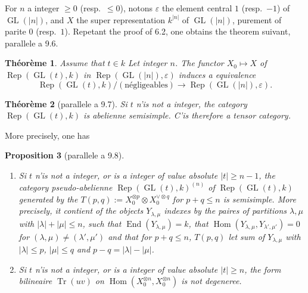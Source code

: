 \documentclass[11pt,a4paper]{article}
\theoremstyle{plain}
\newtheorem{theorem}{Th\'eor\`eme}[section]
\newtheorem{proposition}[theorem]{Proposition}
\theoremstyle{definition}
\DeclareMathOperator{\Hom}{Hom}
\DeclareMathOperator{\End}{End}
\DeclareMathOperator{\Tr}{Tr}
\DeclareMathOperator{\Rep}{Rep}
\DeclareMathOperator{\GL}{GL}
\newcommand{\eps}{\varepsilon}
\begin{document}
For $n$ a integer $\geq 0$ (resp.~$\leq 0$), notons $\eps$ the element central $1$ (resp.~$-1$) of $\GL(|n|)$, and $X$ the super representation $k^{|n|}$ of $\GL(|n|)$, purement of parite $0$ (resp.~$1$). Repetant the proof of 6.2, one obtains the theorem suivant, parallele a 9.6.

\begin{theorem}
Assume that $t \in k$ Let integer $n$. The functor $X_0 \mapsto X$ of $\Rep(\GL(t), k)$ in $\Rep(\GL(|n|), \eps)$ induces a equivalence
\[
\Rep(\GL(t), k)/(\text{n\'egligeables}) \to \Rep(\GL(|n|), \eps).
\]
\end{theorem}

\begin{theorem}[parallele a 9.7]
Si $t$ n'is not a integer, the category $\Rep(\GL(t), k)$ is abelienne semisimple. C'is therefore a tensor category.
\end{theorem}

More precisely, one has

\begin{proposition}[parallele a 9.8]
\begin{enumerate}[label=(\roman*)]
\item Si $t$ n'is not a integer, or is a integer of value absolute $|t| \geq n - 1$, the category pseudo-abelienne $\Rep(\GL(t), k)^{(n)}$ of $\Rep(\GL(t), k)$ generated by the $T(p, q) := X_0^{\otimes p} \otimes X_0^{\vee \otimes q}$ for $p + q \leq n$ is semisimple. More precisely, it contient of the objects $Y_{\lambda, \mu}$ indexes by the paires of partitions $\lambda, \mu$ with $|\lambda| + |\mu| \leq n$, such that $\End(Y_{\lambda, \mu}) = k$, that $\Hom(Y_{\lambda, \mu}, Y_{\lambda', \mu'}) = 0$ for $(\lambda, \mu) \neq (\lambda', \mu')$ and that for $p + q \leq n$, $T(p, q)$ let sum of $Y_{\lambda, \mu}$ with $|\lambda| \leq p$, $|\mu| \leq q$ and $p - q = |\lambda| - |\mu|$.
\item Si $t$ n'is not a integer, or is a integer of value absolute $|t| \geq n$, the form bilineaire $\Tr(uv)$ on $\Hom(X_0^{\otimes n}, X_0^{\otimes n})$ is not degeneree.
\end{enumerate}
\end{proposition}
\end{document}

